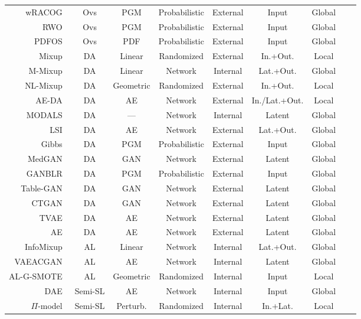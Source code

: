 \begin{longtable}{rcccccccc}
    wRACOG~\cite{das2014racog} & Ovs & PGM & Probabilistic & External & Input & Global \\
    RWO~\cite{zhang2014rwo} & Ovs & PGM & Probabilistic & External & Input & Global \\
    PDFOS~\cite{gao2014pdfos} & Ovs & PDF & Probabilistic & External & Input & Global \\
    Mixup~\cite{zhang2018mixup} & DA & Linear & Randomized & External & In.+Out. & Local \\
    M-Mixup~\cite{verma2019manifold} & DA & Linear & Network & Internal & Lat.+Out. & Global \\
    NL-Mixup~\cite{guo2020nonlinear} & DA & Geometric & Randomized & External & In.+Out. & Local \\
    AE-DA~\cite{feng2020autuencoder} & DA & AE & Network & External & In./Lat.+Out. & Local \\
    MODALS~\cite{cheung2020modals} & DA & --- & Network & Internal & Latent & Global \\
    LSI~\cite{liu2018data} & DA & AE & Network & External & Lat.+Out. & Global \\
    Gibbs~\cite{fakoor2020fast} & DA & PGM & Probabilistic & External & Input & Global \\
    MedGAN~\cite{armanious2020medgan} & DA & GAN & Network & External & Latent & Global \\
    GANBLR~\cite{zhang2021ganblr} & DA & PGM & Probabilistic & External & Input & Global \\
    Table-GAN~\cite{park2018data} & DA & GAN & Network & External & Latent & Global \\
    CTGAN~\cite{xu2019modeling} & DA & GAN & Network & External & Latent & Global \\
    TVAE~\cite{xu2019modeling} & DA & AE & Network & External & Latent & Global \\
    AE~\cite{delgado2021deep} & DA & AE & Network & External & Latent & Global \\
    InfoMixup~\cite{kim2021lada} & AL & Linear & Network & Internal & Lat.+Out. & Global \\
    VAEACGAN~\cite{tran2019bayesian} & AL & AE & Network & Internal & Latent & Global\\
    AL-G-SMOTE~\cite{fonseca2021increasing} & AL & Geometric & Randomized & Internal & Input & Local\\
    DAE~\cite{rasmus2015semi} & Semi-SL & AE & Network & Internal & Input & Global \\ 
    $\Pi$-model~\cite{samuli2017temporal} & Semi-SL & Perturb. & Randomized & Internal & In.+Lat. & Local \\

\end{longtable}
